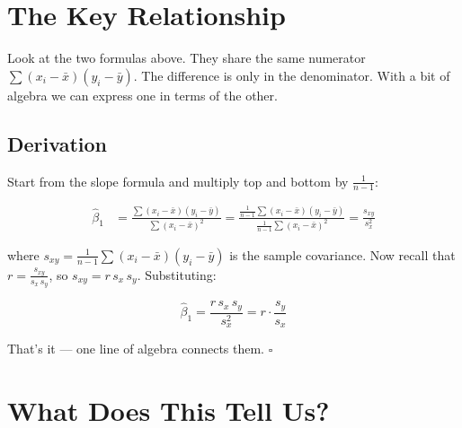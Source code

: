 \documentclass[11pt,a4paper]{article}
\begin{document}
\section{The Key Relationship}

Look at the two formulas above. They share the same numerator
$\sum(x_i - \bar{x})(y_i - \bar{y})$. The difference is only in the
denominator. With a bit of algebra we can express one in terms of the other.

\begin{center}
\end{center}

\subsection*{Derivation}

Start from the slope formula and multiply top and bottom by
$\frac{1}{n-1}$:

\begin{align*}
\hat{\beta}_1
&= \frac{\sum(x_i-\bar{x})(y_i-\bar{y})}{\sum(x_i-\bar{x})^2}
 = \frac{\tfrac{1}{n-1}\sum(x_i-\bar{x})(y_i-\bar{y})}
        {\tfrac{1}{n-1}\sum(x_i-\bar{x})^2}
 = \frac{s_{xy}}{s_x^2}
\end{align*}

where $s_{xy} = \frac{1}{n-1}\sum(x_i-\bar{x})(y_i-\bar{y})$ is the sample
covariance. Now recall that $r = \frac{s_{xy}}{s_x \, s_y}$, so
$s_{xy} = r \, s_x \, s_y$. Substituting:

\[
\hat{\beta}_1
= \frac{r \, s_x \, s_y}{s_x^2}
= r \cdot \frac{s_y}{s_x}
\]

That's it --- one line of algebra connects them. \hfill $\square$

\section{What Does This Tell Us?}
\end{document}
